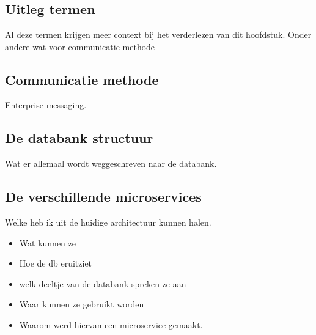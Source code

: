 
\chapter{}
\label{ch:methodologie}

\section{Uitleg termen}
Al deze termen krijgen meer context bij het verderlezen van dit hoofdstuk.
Onder andere wat voor communicatie methode

\section{Communicatie methode}
Enterprise messaging.

\section{De databank structuur}
Wat er allemaal wordt weggeschreven naar de databank.

\section{De verschillende microservices}
Welke heb ik uit de huidige architectuur kunnen halen.
\begin{itemize}
	\item Wat kunnen ze
	\item Hoe de db eruitziet
	\item welk deeltje van de databank spreken ze aan
	\item Waar kunnen ze gebruikt worden
	\item Waarom werd hiervan een microservice gemaakt.
\end{itemize}

